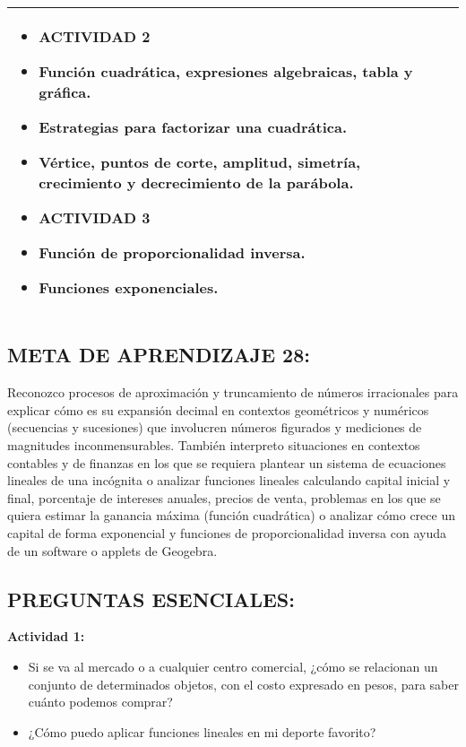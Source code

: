 \documentclass[12pt,a4paper]{article}
\begin{document}
\begin{center}
\begin{tabular}{|
		>{\centering\arraybackslash}m{4.5cm}|
		>{\centering\arraybackslash}m{4.5cm}|
		>{\centering\arraybackslash}m{4.5cm}|}
\begin{itemize}[leftmargin=*]
\item{\textbf{ACTIVIDAD 2}}
\item Función cuadrática, expresiones algebraicas, tabla y gráfica.
\item Estrategias para factorizar una cuadrática.
\item Vértice, puntos de corte, amplitud, simetría, crecimiento y decrecimiento de la parábola.
\item{\textbf{ACTIVIDAD 3}}
\item Función de proporcionalidad inversa.
\item Funciones exponenciales.
\end{itemize}
\\
\hline
\end{tabular}
\end{center}

\vspace{1cm}

\subsection*{META DE APRENDIZAJE 28:}

Reconozco procesos de aproximación y truncamiento de números irracionales para explicar cómo es su expansión decimal en contextos geométricos y numéricos (secuencias y sucesiones) que involucren números figurados y mediciones de magnitudes inconmensurables. También interpreto situaciones en contextos contables y de finanzas en los que se requiera plantear un sistema de ecuaciones lineales de una incógnita o analizar funciones lineales calculando capital inicial y final, porcentaje de intereses anuales, precios de venta, problemas en los que se quiera estimar la ganancia máxima (función cuadrática) o analizar cómo crece un capital de forma exponencial y funciones de proporcionalidad inversa con ayuda de un software o applets de Geogebra.

\subsection*{PREGUNTAS ESENCIALES:}

\textbf{Actividad 1:}
\begin{itemize}
\item Si se va al mercado o a cualquier centro comercial, ¿cómo se relacionan un conjunto de determinados objetos, con el costo expresado en pesos, para saber cuánto podemos comprar?
\item ¿Cómo puedo aplicar funciones lineales en mi deporte favorito?
\end{itemize}
\end{document}
